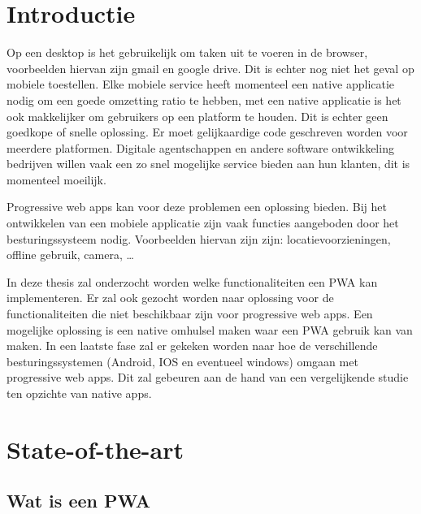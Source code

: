 
\section{Introductie} %
\label{sec:introductie}

Op een desktop is het gebruikelijk om taken uit te voeren in de browser, voorbeelden hiervan zijn gmail en google drive. Dit is echter nog niet het geval op mobiele toestellen. Elke mobiele service heeft momenteel een native applicatie nodig om een goede omzetting ratio te hebben, met een native applicatie is het ook makkelijker om gebruikers op een platform te houden.
Dit is echter geen goedkope of snelle oplossing. Er moet gelijkaardige code geschreven worden voor meerdere platformen. Digitale agentschappen en andere software ontwikkeling bedrijven willen vaak een zo snel mogelijke service bieden aan hun klanten, dit is momenteel moeilijk.

Progressive web apps kan voor deze problemen een oplossing bieden.
Bij het ontwikkelen van een mobiele applicatie zijn vaak functies aangeboden door het besturingssysteem nodig. Voorbeelden hiervan zijn zijn: locatievoorzieningen, offline gebruik, camera, …

In deze thesis zal onderzocht worden welke functionaliteiten een PWA kan implementeren.
Er zal ook gezocht worden naar oplossing voor de functionaliteiten die niet beschikbaar zijn voor progressive web apps.
Een mogelijke oplossing is een native omhulsel maken waar een PWA gebruik kan van maken.
In een laatste fase zal er gekeken worden naar hoe de verschillende besturingssystemen (Android, IOS en eventueel windows) omgaan met progressive web apps.
Dit zal gebeuren aan de hand van een vergelijkende studie ten opzichte van native apps.





\section{State-of-the-art}
\label{sec:state-of-the-art}
\subsection{Wat is een PWA}

